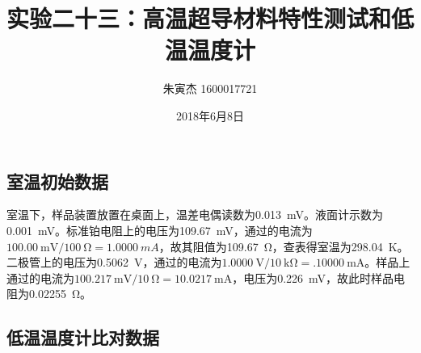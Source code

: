 \documentclass[UTF8]{ctexart}
\begin{document}
\title{实验二十三：高温超导材料特性测试和低温温度计}
\author{朱寅杰 1600017721}
\date{2018年6月8日}
\maketitle
\setcounter{section}{23}
\subsection{室温初始数据}
室温下，样品装置放置在桌面上，温差电偶读数为\SI{.013}{\mV}。液面计示数为\SI{.001}{\mV}。标准铂电阻上的电压为\SI{109.67}{\mV}，通过的电流为$\SI{100.00}{\mV}/\SI{100}{\ohm}=\SI{1.0000}{mA}$，故其阻值为\SI{109.67}{\ohm}，查表得室温为\SI{298.04}{K}。二极管上的电压为\SI{.5062}{\V}，通过的电流为$\SI{1.0000}{\V}/\SI{10}{\kilo\ohm}=\SI{.10000}{\mA}$。样品上通过的电流为$\SI{100.217}{\mV}/\SI{10}{\ohm}=\SI{10.0217}{\mA}$，电压为\SI{.226}{\mV}，故此时样品电阻为\SI{.02255}{\ohm}。

\subsection{低温温度计比对数据}
\end{document}
